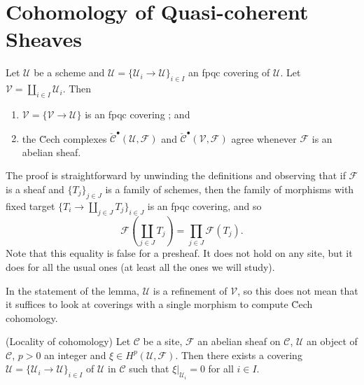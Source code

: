 \section{Cohomology of Quasi-coherent Sheaves}
\label{section-cohomology-quasi-coherent}

\begin{lemma}
\label{lemma-cech-complex}
Let $\mathcal{U}$ be a scheme and $\mathcal{U} = \{ \mathcal{U}_i \to 
\mathcal{U} \}_{i \in I}$ an fpqc covering of $\mathcal{U}$. Let $\mathcal{V} 
= \coprod_{i \in I} \mathcal{U}_i$. Then
\begin{enumerate}
\item 
$\mathcal{V} = \{ \mathcal{V} \to \mathcal{U} \}$ is an fpqc covering ; and
\item
the \u Cech complexes $\check{\mathcal{C}}^\bullet (\mathcal{U}, \mathcal{F})$ 
and $\check{\mathcal{C}}^\bullet (\mathcal{V}, \mathcal{F})$ agree whenever 
$\mathcal{F}$ is an abelian sheaf.
\end{enumerate} 
\end{lemma}

\noindent
The proof is straightforward by unwinding the definitions and observing that if 
$\mathcal{F}$ is a sheaf and $\{ T_j \}_{j \in J}$ is a family of schemes, then 
the family of morphisms with fixed target $\{ T_i \to \coprod_{j \in J} T_j 
\}_{i \in J}$ is an fpqc covering, and so
$$
\mathcal{F} \left( \coprod_{j \in J} T_j \right) = \prod_{j \in J} 
\mathcal{F} (T_j).
$$
Note that this equality is false for a presheaf. It does not hold on any site, 
but it does for all the usual ones (at least all the ones we will study).

\begin{remark}
\label{remark-refinement}
In the statement of the lemma, $\mathcal{U}$ is a refinement of $\mathcal{V}$, 
so this does not mean that it suffices to look at coverings with a single 
morphism to compute \u Cech cohomology.
\end{remark}

\begin{lemma}
\label{lemma-locality-cohomology}
(Locality of cohomology)
Let $\mathcal{C}$ be a site, $\mathcal{F}$ an abelian sheaf on $\mathcal{C}$, 
$\mathcal{U}$ an object of $\mathcal{C}$, $p >0$ an integer and $\xi \in 
H^p(\mathcal{U}, \mathcal{F})$. Then there exists a covering $\mathcal{U} = \{ 
\mathcal{U}_i \to \mathcal{U} \}_{i \in I}$ of $\mathcal{U}$ in $\mathcal{C}$ 
such that $\xi |_{\mathcal{U}_i} = 0$ for all $i \in I$.
\end{lemma}

